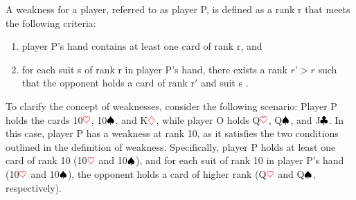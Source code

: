 A weakness for a player, referred to as player P, is defined as a rank r that meets the following criteria: 
\begin{enumerate}
	\item player P's hand contains at least one card of rank r, and
	\item for each suit s of rank r in player P's hand, there exists a rank $r$'$ > r$ such that the opponent holds a card of rank r$'$ and suit s \citep{Bonnet2016TheCO}.
\end{enumerate}

To clarify the concept of weaknesses, consider the following scenario: Player P holds the cards 10$\textcolor{red}{\heartsuit}$, 10$\textcolor{black}{\spadesuit}$, and K$\textcolor{red}{\diamondsuit}$, while player O holds Q$\textcolor{red}{\heartsuit}$, Q$\textcolor{black}{\spadesuit}$, and J$\textcolor{black}{\clubsuit}$. In this case, player P has a weakness at rank 10, as it satisfies the two conditions outlined in the definition of weakness. Specifically, player P holds at least one card of rank 10 (10$\textcolor{red}{\heartsuit}$ and 10$\textcolor{black}{\spadesuit}$), and for each suit of rank 10 in player P's hand (10$\textcolor{red}{\heartsuit}$ and 10$\textcolor{black}{\spadesuit}$), the opponent holds a card of higher rank (Q$\textcolor{red}{\heartsuit}$ and Q$\textcolor{black}{\spadesuit}$, respectively).

